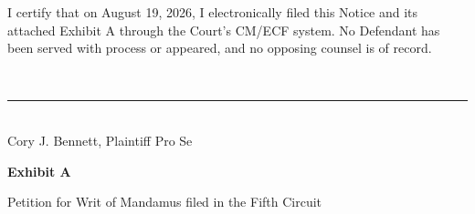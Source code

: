 \documentclass[12pt]{article}
\newcommand{\MandamusPetitionPdf}{Civil/Mandamus/petition-writ-mandamus.pdf}%
\newcommand{\MandamusPetitionPdf}{petition-writ-mandamus.pdf}%
\begin{document}
I certify that on August 19, 2026, I electronically filed this Notice and its attached Exhibit A through the Court's CM/ECF system. No Defendant has been served with process or appeared, and no opposing counsel is of record.

\vspace{0.8em}
\noindent\makebox[3.2in][l]{\SignatureFourOnLine[width=1.5in]}\\[-0.35em]
\rule{3.2in}{0.4pt}\\
Cory J. Bennett, Plaintiff Pro Se

\clearpage
\thispagestyle{empty}
\begin{center}
\vspace*{2.2in}
{\LARGE\bfseries Exhibit A}\par
\vspace{0.7em}
{\large Petition for Writ of Mandamus filed in the Fifth Circuit}
\end{center}


\end{document}
